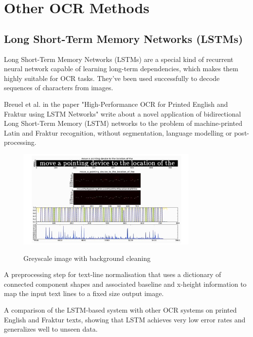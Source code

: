 \newpage

\section{Other OCR Methods}

\subsection{Long Short-Term Memory Networks (LSTMs)}

Long Short-Term Memory Networks (LSTMs) are a special kind of recurrent neural network capable of learning long-term dependencies, which makes them highly suitable for OCR tasks. They've been used successfully to decode sequences of characters from images.\cite{breuelHighPerformanceOCRPrinted2013}

Breuel et al. in the paper "High-Performance OCR for Printed English and Fraktur using LSTM Networks" write about a novel application of bidirectional Long Short-Term Memory (LSTM) networks to the problem of machine-printed Latin and Fraktur recognition, without segmentation, language modelling or post-processing.

\begin{figure}[ht]
    \centering
    \includegraphics[width=0.8\textwidth]{Figures/LSTM_Breuel.jpg}
    \caption[Bruel's illustration of the training steps of the LSTM recognizer]{Greyscale image with background cleaning}\cite{breuelHighPerformanceOCRPrinted2013}
    \label{fig:Breuel LSTM Paper}
\end{figure}



A preprocessing step for text-line normalisation that uses a dictionary of connected component shapes and associated baseline and x-height information to map the input text lines to a fixed size output image.

A comparison of the LSTM-based system with other OCR systems on printed English and Fraktur texts, showing that LSTM achieves very low error rates and generalizes well to unseen data.

